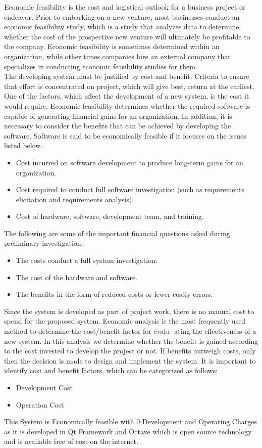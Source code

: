 Economic feasibility is the cost and logistical outlook for a business project or endeavor. Prior to embarking on a new venture, most businesses conduct an economic feasibility study, which is a study that analyzes data to determine whether the cost of the prospective new venture will ultimately be profitable to the company. Economic feasibility is sometimes determined within an organization, while other times companies hire an external company that specializes in conducting economic feasibility studies for them.\\
The developing system must be justified by cost and benefit. Criteria to ensure that effort is concentrated on project, which will give best, return at the earliest. One of the factors, which affect the development of a new system, is the cost it would require. Economic feasibility determines whether the required software is capable of generating financial gains for an organization. In addition, it is necessary to consider the benefits that can be achieved by developing the software. Software is said to be economically feasible if it focuses on the issues listed below.
\begin{itemize}
	\item Cost incurred on software development to produce long-term gains for an organization.
	\item Cost required to conduct full software investigation (such as requirements elicitation and requirements analysis).
	\item Cost of hardware, software, development team, and training.
\end{itemize}

The following are some of the important financial questions asked during preliminary investigation:
\begin{itemize}
	\item The costs conduct a full system investigation.
	\item The cost of the hardware and software.
	\item The benefits in the form of reduced costs or fewer costly errors.
\end{itemize}

Since the system is developed as part of project work, there is no manual cost to spend for the proposed system. 
\noindent Economic analysis is the most frequently used method to determine the cost/benefit factor for evalu-
ating the effectiveness of a new system. In this analysis we determine whether the benefit is gained
according to the cost invested to develop the project or not. If benefits outweigh costs, only then
the decision is made to design and implement the system. It is important to identify cost and benefit
factors, which can be categorized as follows:
\begin{itemize}
\item Development Cost
\item Operation Cost
\end{itemize}
This System is Economically feasible with 0 Development and Operating Charges
as it is developed in Qt Framework and Octave which is open source technology and is available free of cost on the internet.


